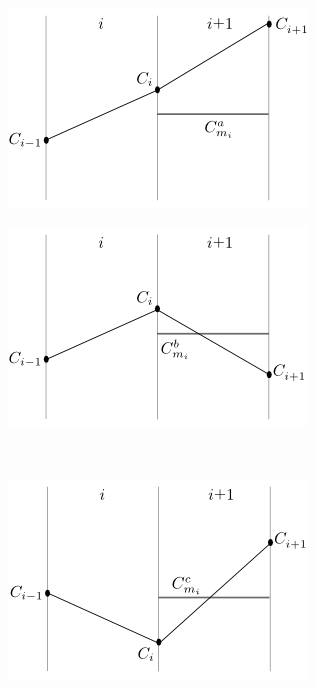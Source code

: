 \documentclass{tewiart}
\begin{document}
\begin{figure}[h]
\centering
\begin{minipage}{.49\linewidth}
\centering \includegraphics[width=\textwidth]{rysunek2a.png}
\label{jedno}
\end{minipage}
\begin{minipage}{.49\linewidth}
\centering \includegraphics[width=\textwidth]{rysunek2b.png}
\label{dwu}
\end{minipage}
\\
\begin{minipage}{.49\linewidth}
\centering \includegraphics[width=\textwidth]{rysunek2c.png}

\end{minipage}
\end{figure}
\end{document}
